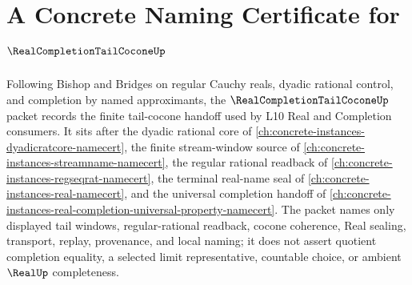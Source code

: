 \chapter{A Concrete Naming Certificate for $\RealCompletionTailCoconeUp$}
\label{ch:concrete-instances-real-completion-tail-cocone-namecert}

Following Bishop and Bridges on regular Cauchy reals, dyadic rational control, and completion by named approximants, the $\RealCompletionTailCoconeUp$ packet records the finite tail-cocone handoff used by L10 Real and Completion consumers. It sits after the dyadic rational core of \autoref{ch:concrete-instances-dyadicratcore-namecert}, the finite stream-window source of \autoref{ch:concrete-instances-streamname-namecert}, the regular rational readback of \autoref{ch:concrete-instances-regseqrat-namecert}, the terminal real-name seal of \autoref{ch:concrete-instances-real-namecert}, and the universal completion handoff of \autoref{ch:concrete-instances-real-completion-universal-property-namecert}. The packet names only displayed tail windows, regular-rational readback, cocone coherence, Real sealing, transport, replay, provenance, and local naming; it does not assert quotient completion equality, a selected limit representative, countable choice, or ambient $\RealUp$ completeness.

